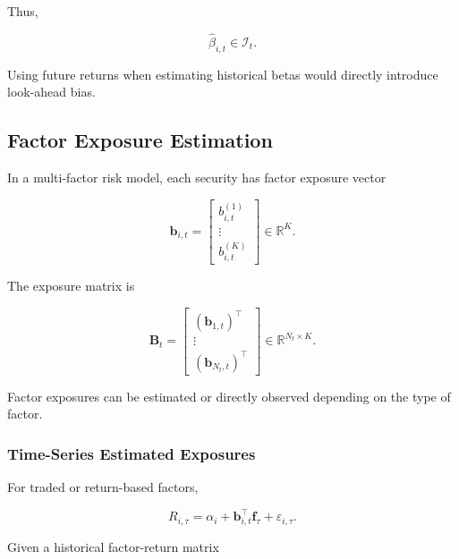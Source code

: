 \documentclass[11pt,a4paper]{article}
\begin{document}
Thus,

\begin{equation}
\boxed{
\widehat{\beta}_{i,t}
\in
\mathcal{I}_t.
}
\end{equation}

Using future returns when estimating historical betas would directly introduce
look-ahead bias.


\subsection{Factor Exposure Estimation}
\label{subsec:factor_exposure_estimation}

In a multi-factor risk model, each security has factor exposure vector

\begin{equation}
\boxed{
\mathbf{b}_{i,t}
=
\begin{bmatrix}
b_{i,t}^{(1)}
\\
\vdots\\
b_{i,t}^{(K)}
\end{bmatrix}
\in
\mathbb{R}^{K}.
}
\end{equation}

The exposure matrix is

\begin{equation}
\boxed{
\mathbf{B}_t
=
\begin{bmatrix}
(\mathbf{b}_{1,t})^\top\\
\vdots\\
(\mathbf{b}_{N_t,t})^\top
\end{bmatrix}
\in
\mathbb{R}^{N_t\times K}.
}
\end{equation}

Factor exposures can be estimated or directly observed depending on the type of
factor.


\subsubsection{Time-Series Estimated Exposures}

For traded or return-based factors,

\begin{equation}
R_{i,\tau}
=
\alpha_i
+
\mathbf{b}_{i,t}^\top
\mathbf{f}_\tau
+
\varepsilon_{i,\tau}.
\end{equation}

Given a historical factor-return matrix
\end{document}
